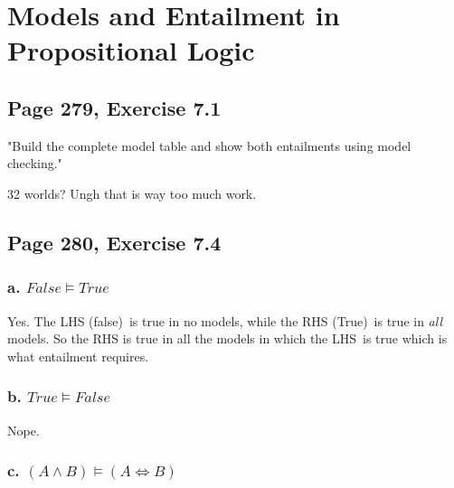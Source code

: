 \documentclass{article}
\begin{document}
\setcounter{secnumdepth}{2} %




\section{Models and Entailment in Propositional Logic}

\subsection{Page 279, Exercise 7.1}

"Build the complete model table and show both entailments using model
checking."

32 worlds? Ungh that is way too much work.

\subsection{Page 280, Exercise 7.4}

\subsubsection{a. $False\models True$}

Yes. The LHS (false)\ is true in no models, while the RHS (True)\ is true in 
\textit{all} models. So the RHS is true in all the models in which the LHS\
is true which is what entailment requires.

\subsubsection{b. $True\models False$}

Nope. 

\subsubsection{c. $\left( A\wedge B\right) \models \left( A\Leftrightarrow
B\right) $}
\end{document}
